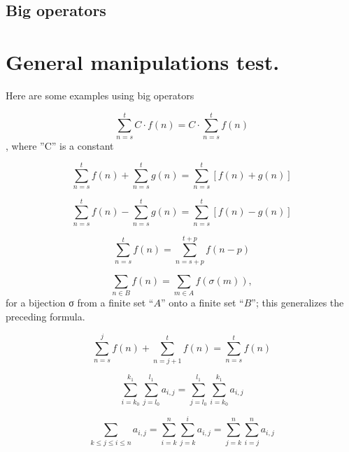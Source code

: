  \subsection{Big operators}
 \begin{multicols}{2}
 \showop{}
 \showop{}
 \showop{}
 \showop{}
 \showop{}
 \showop{}
 \showop{}
 \showop{}
 \showop{}
 \showop{}
 \showop{}
 \showop{}
 \showop{}
 \showop{}
 \showop{}
 \showop{}
 \showop{}
 \showop{}
 \showop{}
 \showop{}
 \showop{}
 \showop{}
 \showop{}
 \showop{}
 \showop{}
 \showop{}
 \showop{}
 \showop{}
 \showop{}
 \showop{}
 \showop{}
 \showop{}
 \showop{}
 \end{multicols}
 
 \section{General manipulations test.}
 
 Here are some examples using big operators

$$\sum_{n=s}^t C\cdot f(n) = C\cdot \sum_{n=s}^t f(n)$$, where ''C'' is a constant

\[\sum_{n=s}^t f(n) + \sum_{n=s}^{t} g(n) = \sum_{n=s}^t \left[f(n) + g(n)\right]\] 

\[\sum_{n=s}^t f(n) - \sum_{n=s}^{t} g(n) = \sum_{n=s}^t \left[f(n) - g(n)\right]\] 

\[\sum_{n=s}^t f(n) = \sum_{n=s+p}^{t+p} f(n-p) \] 

\[\sum_{n\in B} f(n) = \sum_{m\in A} f(\sigma(m)),\] for a bijection σ from a finite set ``$A$'' onto a finite set ``$B$''; this generalizes the preceding formula.

\[\sum_{n=s}^j f(n) + \sum_{n=j+1}^t f(n) = \sum_{n=s}^t f(n)\] 

\[\sum_{i=k_0}^{k_1}\sum_{j=l_0}^{l_1} a_{i,j} = \sum_{j=l_0}^{l_1}\sum_{i=k_0}^{k_1} a_{i,j}\] 

\[\sum_{k\le j \le i\le n} a_{i,j} = \sum_{i=k}^n\sum_{j=k}^i a_{i,j} = \sum_{j=k}^n\sum_{i=j}^n a_{i,j}\] 


